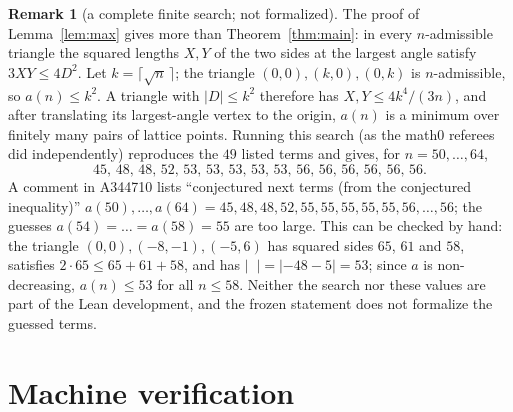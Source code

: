 \documentclass[11pt]{amsart}
\theoremstyle{plain}
\theoremstyle{definition}
\newtheorem{remark}[theorem]{Remark}
\DeclareMathOperator{\dett}{det_2}
\begin{document}
\begin{remark}[a complete finite search; not formalized]\label{rem:search}
The proof of Lemma~\ref{lem:max} gives more than Theorem~\ref{thm:main}: in every $n$-admissible triangle the squared lengths $X,Y$ of the two sides at the largest angle satisfy $3XY\le4D^2$. Let $k=\lceil\sqrt n\,\rceil$; the triangle $(0,0),(k,0),(0,k)$ is $n$-admissible, so $a(n)\le k^2$. A triangle with $|D|\le k^2$ therefore has $X,Y\le 4k^4/(3n)$, and after translating its largest-angle vertex to the origin, $a(n)$ is a minimum over finitely many pairs of lattice points. Running this search (as the math0 referees did independently) reproduces the $49$ listed terms and gives, for $n=50,\dots,64$,
\[
  45,\,48,\,48,\,52,\,53,\,53,\,53,\,53,\,53,\,56,\,56,\,56,\,56,\,56,\,56 .
\]
A comment in A344710 lists ``conjectured next terms (from the conjectured inequality)'' $a(50),\dots,a(64)=45,48,48,52,55,55,55,55,55,56,\dots,56$; the guesses $a(54)=\dots=a(58)=55$ are too large. This can be checked by hand: the triangle $(0,0),(-8,-1),(-5,6)$ has squared sides $65$, $61$ and $58$, satisfies $2\cdot65\le65+61+58$, and has $|\dett|=|{-48}-5|=53$; since $a$ is non-decreasing, $a(n)\le53$ for all $n\le58$. Neither the search nor these values are part of the Lean development, and the frozen statement does not formalize the guessed terms.
\end{remark}

\section{Machine verification}\label{sec:lean}
\end{document}

